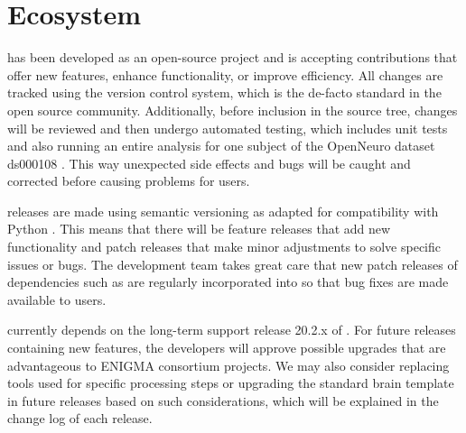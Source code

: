 \section{Ecosystem}

 has been developed as an open-source project and is accepting contributions that offer new features, enhance functionality, or improve efficiency. All changes are tracked using the  version control system, which is the de-facto standard in the open source community. Additionally, before inclusion in the source tree, changes will be reviewed and then undergo automated testing, which includes unit tests and also running an entire analysis for one subject of the OpenNeuro dataset ds000108 \parencite{wager2008}. This way unexpected side effects and bugs will be caught and corrected before causing problems for users.

 releases are made using semantic versioning as adapted for compatibility with Python \parencite{coghlan2013}. This means that there will be feature releases that add new functionality and patch releases that make minor adjustments to solve specific issues or bugs. The development team takes great care that new patch releases of dependencies such as  are regularly incorporated into  so that bug fixes are made available to users.

 currently depends on the long-term support release 20.2.x of . For future releases containing new features, the developers will approve  possible upgrades that are advantageous to ENIGMA consortium projects. We may also consider replacing tools used for specific processing steps or upgrading the standard brain template in future releases based on such considerations, which will be explained in the change log of each release.

